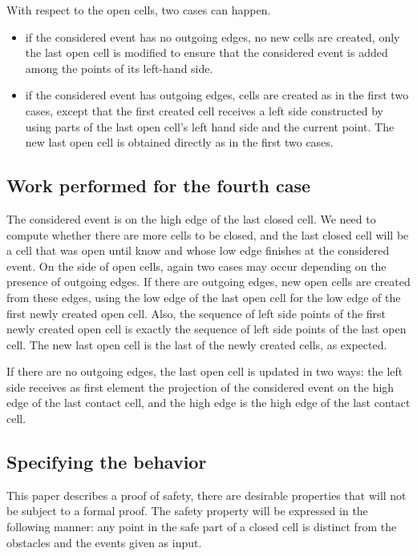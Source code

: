 \documentclass[a4paper, USenglish, cleveref, autoref, thm-restate]{lipics-v2021}
\begin{document}
With respect to the open cells, two cases can happen.
\begin{itemize}
\item if the considered event has no outgoing edges, no new cells
are created, only the last open cell is modified to ensure that the considered
event is added among the points of its left-hand side.
\item if the considered event has outgoing edges, cells are created as
  in the first two cases, except that the first created cell receives
  a left side constructed by using parts of the last open cell's left
  hand side and the current point.  The new last open cell is obtained
directly as in the first two cases.
\end{itemize}
\subsection{Work performed for the fourth case}
The considered event is on the high edge of the last closed cell.  We
need to compute whether there are more cells to be closed, and the
last closed cell will be a cell that was open until know and whose
low edge finishes at the considered event.  On the side of open cells,
again two cases may occur depending on the presence of outgoing
edges.  If there are outgoing edges, new open cells are created from
these edges, using the low edge of the last open cell for the low edge
of the first newly created open cell.  Also, the sequence of 
left side points of
the first newly created open cell is exactly the sequence of left side
points of the last open cell.  The new last open cell is the last of
the newly created cells, as expected.

If there are no outgoing edges, the last open cell is updated in two
ways: the left side receives as first element the projection of the
considered event on the high edge of the last contact cell, and the
high edge is the high edge of the last contact cell.

\subsection{Specifying the behavior}
This paper describes a proof of safety, there are desirable properties
that will not be subject to a formal proof.  The safety property will
be expressed in the following manner: any point in the safe part of a
closed cell is distinct from the obstacles and the events given as input.
\end{document}
